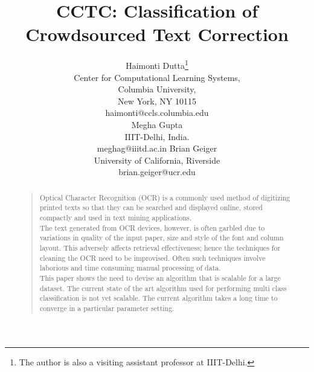 \documentclass[letterpaper]{article}
\begin{document}
%
\title{CCTC: \textbf{C}lassification of \textbf{C}rowdsourced \textbf{T}ext \textbf{C}orrection}

\author{Haimonti Dutta\thanks{The author is also a visiting assistant professor at IIIT-Delhi.}\\
Center for Computational Learning Systems, \\
Columbia University, \\
New York, NY 10115\\
haimonti@ccls.columbia.edu\\
\And
Megha Gupta \\ 
IIIT-Delhi, India. \\
meghag@iiitd.ac.in
\And 
Brian Geiger \\
University of California, Riverside \\
brian.geiger@ucr.edu
}

\maketitle
\begin{abstract}
\begin{quote}
\noindent Optical Character Recognition (OCR) is a commonly used method of digitizing printed texts so that they can be searched and displayed online, stored compactly and used in text mining applications.\\
The text generated from OCR devices, however, is often garbled due to variations in quality of the input paper, size and style of the font and column layout. This adversely affects retrieval effectiveness; hence the techniques for cleaning the OCR need to be improvised. Often such techniques involve laborious and time consuming manual processing of data.\\
This paper shows the need to devise an algorithm that is scalable for a large dataset. The current state of the art algorithm used for performing multi class classification is not yet scalable. The current algorithm takes a long time to converge in a particular parameter setting.

\end{quote}
\end{abstract}
\end{document}
